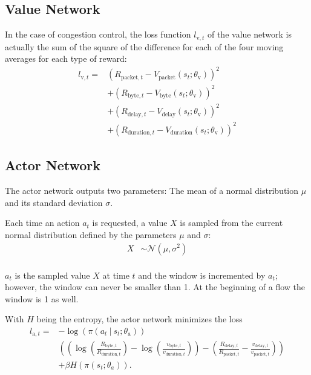 \documentclass[sigconf]{acmart}
\newcommand\givenbase[1][]{\:#1\lvert\:}
\let\given\givenbase
\begin{document}
\subsection{Value Network}
\label{subsec:value}

In the case of congestion control, the loss function $l_{\text{v},t}$ of the value network is actually the sum of the square of the difference for each of the four moving averages for each type of reward:
\begin{align*}
l_{\text{v},t} =& \left(R_{\text{packet},t} - V_\text{packet}(s_t; \theta_\text{v})\right)^2 \\
&+\left(R_{\text{byte},t} - V_\text{byte}(s_t; \theta_\text{v})\right)^2 \\
&+\left(R_{\text{delay},t} - V_\text{delay}(s_t; \theta_\text{v})\right)^2 \\
&+\left(R_{\text{duration},t} - V_\text{duration}(s_t; \theta_\text{v})\right)^2
\end{align*}

\subsection{Actor Network}
\label{subsec:actor}

The actor network outputs two parameters: The mean of a normal distribution $\mu$ and its standard deviation $\sigma$. 

Each time an action $a_t$ is requested, a value $X$ is sampled from the current normal distribution defined by the parameters $\mu$ and $\sigma$: 
\begin{align*}
X&\sim {\mathcal {N}}(\mu ,\sigma^{2})\\
\end{align*}

$a_t$ is the sampled value $X$ at time $t$ and the window is incremented by $a_t$; however, the window can never be smaller than 1. At the beginning of a flow the window is 1 as well.

With $H$ being the entropy, the actor network minimizes the loss
\begin{align*}
l_{\text{a},t} =& -\log \left( \pi \left( a_t \given s_t ; \theta_\text{a} \right) \right)\\
&\left( \left(\log\left(\frac{R_{\text{byte},t}}{{R_{\text{duration},t}}}\right) - \log\left(\frac{v_{\text{byte},t}}{{v_{\text{duration},t}}}\right)\right) - \left( \frac{R_{\text{delay},t}}{{R_{\text{packet},t}}}- \frac{v_{\text{delay},t}}{{v_{\text{packet},t}}} \right)\right)\\ 
&+ \beta H\left( \pi\left( s_t; \theta_a \right)\right).
\end{align*}
 
\end{document}
